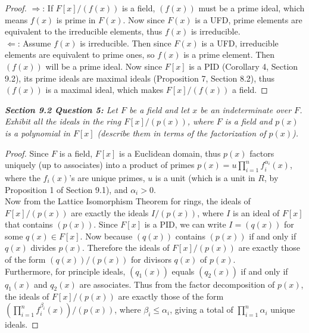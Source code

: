 \documentclass{article}
\begin{document}
  \begin{proof}
    $\Rightarrow$: If $F[x]/(f(x))$ is a field, $(f(x))$ must be a prime
    ideal, which means $f(x)$ is prime in $F(x)$. Now  since $F(x)$ is a
    UFD, prime elements are equivalent to the irreducible elements, thus
    $f(x)$ is irreducible. \\

    $\Leftarrow$: Assume $f(x)$ is irreducible. Then since $F(x)$ is a UFD,
    irreducible elements are equivalent to prime ones, so $f(x)$ is a prime
    element. Then $(f(x))$ will be a prime ideal. Now since $F[x]$ is a PID
    (Corollary 4, Section 9.2), its prime ideals are maximal ideals
    (Proposition 7, Section 8.2), thus $(f(x))$ is a maximal ideal, which
    makes $F[x]/(f(x))$ a field.
  \end{proof}

\it \textbf{Section 9.2 Question 5:} Let $F$ be a field and let $x$ be an
  indeterminate over $F$. Exhibit all the ideals in the ring $F[x]/(p(x))$,
  where $F$ is a field and $p(x)$ is a polynomial in $F[x]$ (describe them
  in terms of the factorization of $p(x)$).

  \begin{proof}
    Since $F$ is a field, $F[x]$ is a Euclidean domain, thus $p(x)$ factors
    uniquely (up to associates) into a product of primes
    $p(x)=u\prod_{i=1}^nf_i^{\alpha_i}(x)$, where the $f_i(x)$'s are unique
    primes, $u$ is a unit (which is a unit in $R$, by Proposition 1 of
    Section 9.1), and $\alpha_i>0$. \\

    Now from the Lattice Isomorphism Theorem for rings, the ideals of
    $F[x]/(p(x))$ are exactly the ideals $I/(p(x))$, where $I$ is an ideal
    of $F[x]$ that contains $(p(x))$. Since $F[x]$ is a PID, we can write
    $I=(q(x))$ for some $q(x)\in F[x]$. Now because $(q(x))$ contains
    $(p(x))$ if and only if $q(x)$ divides $p(x)$. Therefore the ideals of
    $F[x]/(p(x))$ are exactly those of the form $(q(x))/(p(x))$ for
    divisors $q(x)$ of $p(x)$. \\

    Furthermore, for principle ideals, $(q_1(x))$ equals $(q_2(x))$ if and
    only if $q_1(x)$ and $q_2(x)$ are associates. Thus from the factor
    decomposition of $p(x)$, the ideals of $F[x]/(p(x))$ are exactly those
    of the form $(\prod_{i=1}^nf_i^{\beta_i}(x))/(p(x))$, where
    $\beta_i\leq\alpha_i$, giving a total of $\prod_{i=1}^n\alpha_i$
    unique ideals.
  \end{proof}
\end{document}

